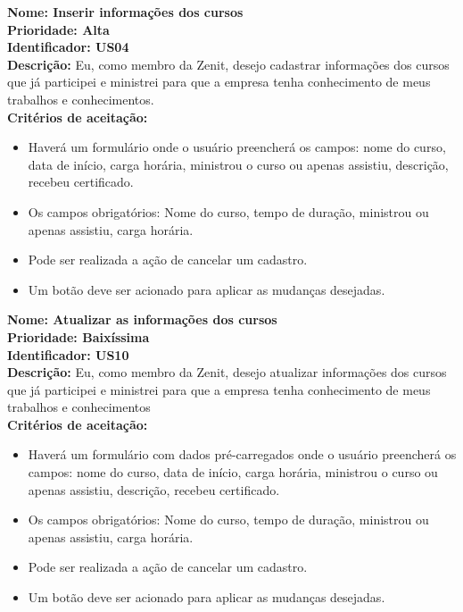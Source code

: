 \begin{anexosenv}
\textbf{Nome: Inserir informações dos cursos\\
    Prioridade: Alta\\
    Identificador: US04\\
    Descrição:} Eu, como membro da Zenit, desejo cadastrar informações dos cursos que já participei e ministrei para que a empresa tenha conhecimento de meus trabalhos e conhecimentos.\\
\textbf{Critérios de aceitação:}
\begin{itemize}
    \item Haverá um formulário onde o usuário preencherá os campos: nome do curso, data de início, carga horária, ministrou o curso ou apenas assistiu, descrição, recebeu certificado.
    \item Os campos obrigatórios: Nome do curso, tempo de duração, ministrou ou apenas assistiu, carga horária.
    \item Pode ser realizada a ação de cancelar um cadastro.
    \item Um botão deve ser acionado para aplicar as mudanças desejadas.
\end{itemize}

\textbf{Nome: Atualizar as informações dos cursos\\
    Prioridade:  Baixíssima\\
    Identificador: US10\\
    Descrição:} Eu, como membro da Zenit, desejo atualizar informações dos cursos que já participei e ministrei para que a empresa tenha conhecimento de meus trabalhos e conhecimentos\\
\textbf{Critérios de aceitação:}
\begin{itemize}
    \item Haverá um formulário com dados pré-carregados onde o usuário preencherá os campos: nome do curso, data de início, carga horária, ministrou o curso ou apenas assistiu, descrição, recebeu certificado.
    \item Os campos obrigatórios: Nome do curso, tempo de duração, ministrou ou apenas assistiu, carga horária.
    \item Pode ser realizada a ação de cancelar um cadastro.
    \item Um botão deve ser acionado para aplicar as mudanças desejadas.
\end{itemize}


\end{anexosenv}
